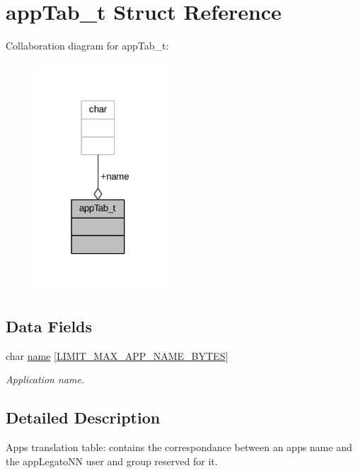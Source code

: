 \hypertarget{structapp_tab__t}{}\section{app\+Tab\+\_\+t Struct Reference}
\label{structapp_tab__t}


Collaboration diagram for app\+Tab\+\_\+t\+:
\nopagebreak
\begin{figure}[H]
\begin{center}
\leavevmode
\includegraphics[width=142pt]{structapp_tab__t__coll__graph}
\end{center}
\end{figure}
\subsection*{Data Fields}
\begin{DoxyCompactItemize}
\item 
char \hyperlink{structapp_tab__t_afe04e8994943f96a04e9abd761067a29}{name} \mbox{[}\hyperlink{limit_8h_a3be1f83793d35365d5f9e765e0ffc619}{L\+I\+M\+I\+T\+\_\+\+M\+A\+X\+\_\+\+A\+P\+P\+\_\+\+N\+A\+M\+E\+\_\+\+B\+Y\+T\+ES}\mbox{]}
\begin{DoxyCompactList}\small\item\em Application name. \end{DoxyCompactList}\end{DoxyCompactItemize}


\subsection{Detailed Description}
Apps translation table\+: contains the correspondance between an apps name and the app\+Legato\+NN user and group reserved for it. 

